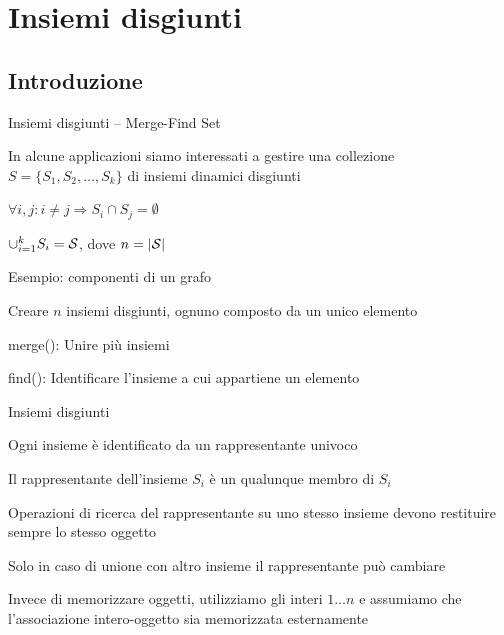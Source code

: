 \section{Insiemi disgiunti}

\subsection{Introduzione}

\begin{frame}{Insiemi disgiunti -- Merge-Find Set}

\vspace{-9pt}
\begin{myboxtitle}[Motivazioni]
\BIL
\item In alcune applicazioni siamo interessati a gestire una collezione 
$S = \{ S_1, S_2, \ldots, S_k \}$ di \alert{insiemi dinamici disgiunti}
  \smallskip
  \BI
  \item $\forall i,j: i \neq j \Rightarrow S_i \cap S_j = \emptyset$
  \item $\cup_{i=1}^k S_i = \cal S$, dove $n = |\cal S|$
  \EI
\item Esempio: componenti di un grafo
\EIL
\end{myboxtitle}

\begin{myboxtitle}
\BIL
\item Creare $n$ insiemi disgiunti, ognuno composto da un unico elemento
\item \textsf{merge}(): Unire più insiemi
\item \textsf{find}(): Identificare l'insieme a cui appartiene un elemento
\EIL
\end{myboxtitle}

\end{frame}


\begin{frame}{Insiemi disgiunti}

\vspace{-9pt}
\begin{myboxtitle}[Rappresentante]
\BIL
\item Ogni insieme è identificato da un \alert{rappresentante} univoco
\item Il rappresentante  dell'insieme $S_i$  è un qualunque membro di $S_i$
\item Operazioni di ricerca del rappresentante su uno stesso insieme devono restituire sempre lo stesso oggetto
\item Solo in caso di unione con altro insieme il rappresentante può cambiare
\EIL
\end{myboxtitle}

\begin{myboxtitle}[Memorizzazione]
Invece di memorizzare oggetti, utilizziamo gli interi $1 \ldots n$
e assumiamo che l'associazione intero-oggetto sia memorizzata esternamente
\end{myboxtitle}

\end{frame}

